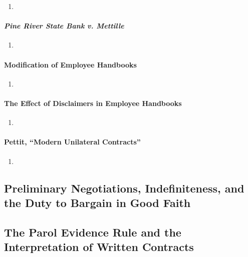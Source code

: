 \begin{enumerate}
    \item %
\end{enumerate}

\paragraph{\emph{Pine River State Bank v. Mettille}}

\begin{enumerate}
    \item %
\end{enumerate}

\paragraph{Modification of Employee Handbooks}

\begin{enumerate}
    \item %
\end{enumerate}

\paragraph{The Effect of Disclaimers in Employee Handbooks}

\begin{enumerate}
    \item %
\end{enumerate}

\paragraph{Pettit, ``Modern Unilateral Contracts''}

\begin{enumerate}
    \item %
\end{enumerate}

\subsection{Preliminary Negotiations, Indefiniteness, and the Duty to Bargain 
in Good Faith}


\subsection{The Parol Evidence Rule and the Interpretation of Written 
Contracts}


